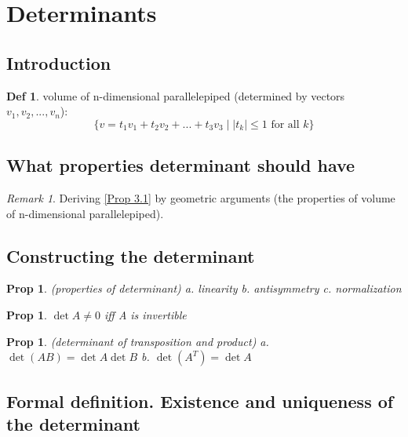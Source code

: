 \documentclass[hidelinks]{article}
\theoremstyle{definition}
\newtheorem*{defin}{Def}
\theoremstyle{plain}
\newtheorem{proposition}[theorem]{Prop}
\theoremstyle{remark}
\newtheorem*{remark}{Remark}
\begin{document}
\section{Determinants}

\subsection{Introduction}

\begin{defin}
volume of n-dimensional parallelepiped (determined by vectors $v_1, v_2, ..., v_n$):
\[
\{v=t_1v_1+t_2v_2+...+t_3v_3\mid |t_k|\leq 1 \textrm{ for all }k\}
\]
\end{defin}

\subsection{What properties determinant should have}

\begin{remark}
Deriving \autoref{Prop 3.1} by geometric arguments (the properties of volume of n-dimensional parallelepiped).
\end{remark}

\subsection{Constructing the determinant}

\begin{proposition}\label{Prop 3.1} (properties of determinant) \newline
\indent a. linearity \newline
\indent b. antisymmetry \newline
\indent c. normalization
\end{proposition}

\begin{proposition}
$\det A\neq 0$ iff A is invertible
\end{proposition}

\begin{proposition}\label{Prop 3.3} (determinant of transposition and product) \newline
\indent a. $\det (AB)=\det A\det B$ \newline
\indent b. $\det (A^{T})=\det A$
\end{proposition}

\subsection{Formal definition. Existence and uniqueness of the
determinant}
\end{document}
